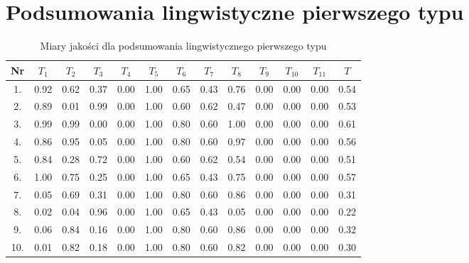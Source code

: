 \documentclass{article}
\begin{document}
\section{Podsumowania lingwistyczne pierwszego typu}
    \begin{table}[h!]
    \centering
    \begin{tabular}{|c|c|c|c|c|c|c|c|c|c|c|c|c|}
    \hline
    \textbf{Nr} & \textbf{\(T_1\)} &\textbf{\(T_2\)} & \textbf{\(T_3\)} & \textbf{\(T_4\)} & \textbf{\(T_5\)} & \textbf{\(T_6\)} & \textbf{\(T_7\)} & \textbf{\(T_8\)} & \textbf{\(T_9\)} & \textbf{\(T_{10}\)} & \textbf{\(T_{11}\)} & \textbf{\(T\)} \\ \hline
    1. & 0.92 & 0.62 & 0.37 & 0.00 & 1.00 & 0.65 & 0.43 & 0.76 & 0.00 & 0.00 & 0.00 & 0.54 \\
    \hline
    2. & 0.89 & 0.01 & 0.99 & 0.00 & 1.00 & 0.60 & 0.62 & 0.47 & 0.00 & 0.00 & 0.00 & 0.53 \\
    \hline
    3. & 0.99 & 0.99 & 0.00 & 0.00 & 1.00 & 0.80 & 0.60 & 1.00 & 0.00 & 0.00 & 0.00 & 0.61 \\
    \hline
    4. & 0.86 & 0.95 & 0.05 & 0.00 & 1.00 & 0.80 & 0.60 & 0.97 & 0.00 & 0.00 & 0.00 & 0.56 \\
    \hline
    5. & 0.84 & 0.28 & 0.72 & 0.00 & 1.00 & 0.60 & 0.62 & 0.54 & 0.00 & 0.00 & 0.00 & 0.51 \\
    \hline
    6. & 1.00 & 0.75 & 0.25 & 0.00 & 1.00 & 0.65 & 0.43 & 0.75 & 0.00 & 0.00 & 0.00 & 0.57 \\
    \hline
    7. & 0.05 & 0.69 & 0.31 & 0.00 & 1.00 & 0.80 & 0.60 & 0.86 & 0.00 & 0.00 & 0.00 & 0.31 \\
    \hline
    8. & 0.02 & 0.04 & 0.96 & 0.00 & 1.00 & 0.65 & 0.43 & 0.05 & 0.00 & 0.00 & 0.00 & 0.22 \\
    \hline
    9. & 0.06 & 0.84 & 0.16 & 0.00 & 1.00 & 0.80 & 0.60 & 0.86 & 0.00 & 0.00 & 0.00 & 0.32 \\ 
    \hline
    10. & 0.01 & 0.82 & 0.18 & 0.00 & 1.00 & 0.80 & 0.60 & 0.82 & 0.00 & 0.00 & 0.00 & 0.30 \\ 
    \hline
    \end{tabular}
    \caption{Miary jakości dla podsumowania lingwistycznego pierwszego typu}
    \end{table}
\end{document}
